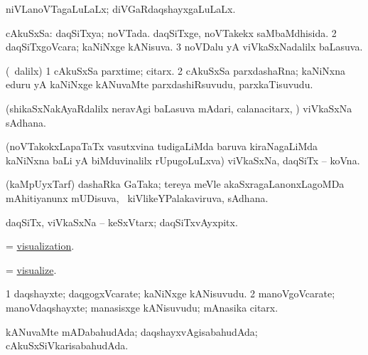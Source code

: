 \bentry 
{} 
\gl{\gu}
\expl{}
\bmng
 niVLanoVTagaLuLaLx; diVGaRdaqshayxgaLuLaLx. 
\emng
\eentry

\bentry 
{} 
\gl{\gu}
\expl{}
\bmng
\bnum
{} cAkuSxSa: 
\banum
{} daqSiTxya; noVTada. 
 daqSiTxge, noVTakekx saMbaMdhisida. 
\eanum
\numie
\num{2} daqSiTxgoVcara; kaNiNxge kANisuva. 
\num{3} noVDalu yA viVkaSxNadalilx baLasuva. 
\enum
\emng
\eentry

\bentry 
{} 
\gl{\nA}
\expl{}
\bmng
 (\sA\ \bava dalilx) 
\bnum
\num{1} cAkuSxSa parxtime; citarx. 
\num{2} cAkuSxSa parxdashaRna; kaNiNxna eduru yA kaNiNxge kANuvaMte parxdashiRsuvudu, parxkaTisuvudu. 
\enum
\emng
\eentry

\bentry
{}
\gl{\nA}
\expl{}
\bmng
 (shikaSxNakAyaRdalilx neravAgi baLasuva mAdari, calanacitarx, \mo) viVkaSxNa sAdhana. 
\emng
\eentry

\bentry 
{} 
\gl{\nA}
\expl{}
\bmng
 (noVTakokxLapaTaTx vasutxvina tudigaLiMda baruva kiraNagaLiMda kaNiNxna baLi yA biMduvinalilx rUpugoLuLxva) viVkaSxNa, daqSiTx -- koVna. 
\emng
\eentry

\bentry 
{} 
\gl{\nA}
\expl{}
\bmng
 (kaMpUyxTarf) dashaRka GaTaka; tereya meVle akaSxragaLanonxLagoMDa mAhitiyanunx mUDisuva, \sA\ kiVlikeYPalakaviruva, sAdhana. 
\emng
\eentry

\bentry
{} 
\gl{\nA}
\expl{}
\bmng
 daqSiTx, viVkaSxNa -- keSxVtarx; daqSiTxvAyxpitx. 
\emng
\eentry

\bentry 
{} 
\gl{\nA}
\expl{}
\bmng
 = \hyperlink{visualization}{visualization}. 
\emng
\eentry

\bentry 
{} 
\gl{\sakirx}
\expl{}
\bmng
 = \hyperlink{visualize}{visualize}. 
\emng
\eentry

\bentry
{} 
\gl{\nA}
\expl{}
\bmng
\bnum
\num{1} daqshayxte; daqgogxVcarate; kaNiNxge kANisuvudu. 
\num{2} manoVgoVcarate; manoVdaqshayxte; manasisxge kANisuvudu; mAnasika citarx. 
\enum
\emng
\eentry

\bentry
{} 
\gl{\gu}
\expl{}
\bmng
 kANuvaMte mADabahudAda; daqshayxvAgisabahudAda; cAkuSxSiVkarisabahudAda. 
\emng
\eentry

